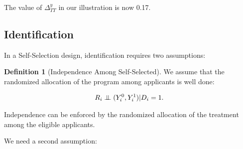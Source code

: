 \documentclass[
]{book}
\newenvironment{Shaded}{\begin{snugshade}}{\end{snugshade}}
\newcommand{\AttributeTok}[1]{\textcolor[rgb]{0.77,0.63,0.00}{#1}}
\newcommand{\ConstantTok}[1]{\textcolor[rgb]{0.00,0.00,0.00}{#1}}
\newcommand{\DecValTok}[1]{\textcolor[rgb]{0.00,0.00,0.81}{#1}}
\newcommand{\FunctionTok}[1]{\textcolor[rgb]{0.00,0.00,0.00}{#1}}
\newcommand{\NormalTok}[1]{#1}
\newcommand{\OtherTok}[1]{\textcolor[rgb]{0.56,0.35,0.01}{#1}}
\newcommand{\SpecialCharTok}[1]{\textcolor[rgb]{0.00,0.00,0.00}{#1}}
\newcommand{\StringTok}[1]{\textcolor[rgb]{0.31,0.60,0.02}{#1}}
\newcommand\Ind{\protect\mathpalette{\protect\independenT}{\perp}}
\def\independenT#1#2{\mathrel{\setbox0\hbox{$#1#2$}\copy0\kern-\wd0\mkern4mu\box0}}
\theoremstyle{definition}
\newtheorem{definition}{Definition}[chapter]
\theoremstyle{definition}
\theoremstyle{definition}
\theoremstyle{definition}
\theoremstyle{remark}
\begin{document}
\begin{Shaded}
\end{Shaded}

The value of \(\Delta^y_{TT}\) in our illustration is now 0.17.

\hypertarget{identification-1}{%
\subsection{Identification}\label{identification-1}}

In a Self-Selection design, identification requires two assumptions:

\begin{definition}[Independence Among Self-Selected]
\protect\hypertarget{def:indepss}{}{\label{def:indepss} \iffalse (Independence Among Self-Selected) \fi{} }We assume that the randomized allocation of the program among applicants is well done:

\begin{align*}
  R_i\Ind(Y_i^0,Y_i^1)|D_i=1.
\end{align*}
\end{definition}

Independence can be enforced by the randomized allocation of the treatment among the eligible applicants.

We need a second assumption:
\end{document}
